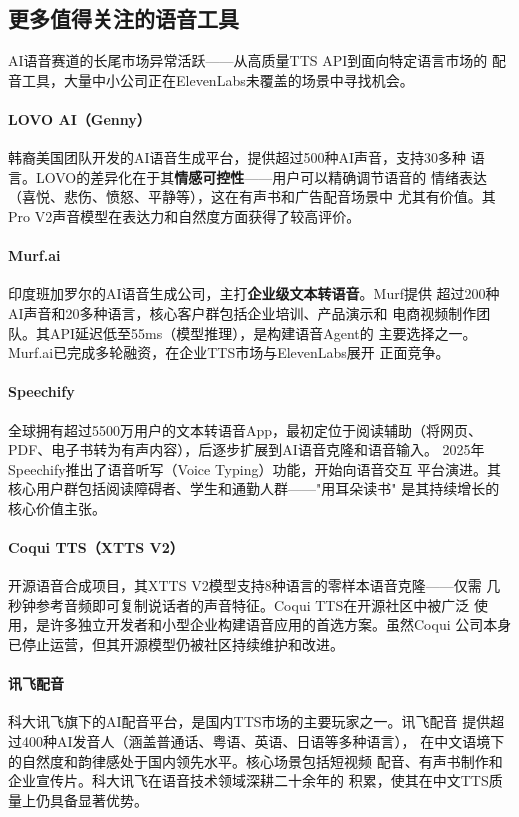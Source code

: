 \subsection{更多值得关注的语音工具}

AI语音赛道的长尾市场异常活跃——从高质量TTS API到面向特定语言市场的
配音工具，大量中小公司正在ElevenLabs未覆盖的场景中寻找机会。

\paragraph{LOVO AI（Genny）}
韩裔美国团队开发的AI语音生成平台，提供超过500种AI声音，支持30多种
语言。LOVO的差异化在于其\textbf{情感可控性}——用户可以精确调节语音的
情绪表达（喜悦、悲伤、愤怒、平静等），这在有声书和广告配音场景中
尤其有价值。其Pro V2声音模型在表达力和自然度方面获得了较高评价。

\paragraph{Murf.ai}
印度班加罗尔的AI语音生成公司，主打\textbf{企业级文本转语音}。Murf提供
超过200种AI声音和20多种语言，核心客户群包括企业培训、产品演示和
电商视频制作团队。其API延迟低至55ms（模型推理），是构建语音Agent的
主要选择之一。Murf.ai已完成多轮融资，在企业TTS市场与ElevenLabs展开
正面竞争。

\paragraph{Speechify}
全球拥有超过5500万用户的文本转语音App，最初定位于阅读辅助（将网页、
PDF、电子书转为有声内容），后逐步扩展到AI语音克隆和语音输入。
2025年Speechify推出了语音听写（Voice Typing）功能，开始向语音交互
平台演进。其核心用户群包括阅读障碍者、学生和通勤人群——"用耳朵读书"
是其持续增长的核心价值主张。

\paragraph{Coqui TTS（XTTS V2）}
开源语音合成项目，其XTTS V2模型支持8种语言的零样本语音克隆——仅需
几秒钟参考音频即可复制说话者的声音特征。Coqui TTS在开源社区中被广泛
使用，是许多独立开发者和小型企业构建语音应用的首选方案。虽然Coqui
公司本身已停止运营，但其开源模型仍被社区持续维护和改进。

\paragraph{讯飞配音}
科大讯飞旗下的AI配音平台，是国内TTS市场的主要玩家之一。讯飞配音
提供超过400种AI发音人（涵盖普通话、粤语、英语、日语等多种语言），
在中文语境下的自然度和韵律感处于国内领先水平。核心场景包括短视频
配音、有声书制作和企业宣传片。科大讯飞在语音技术领域深耕二十余年的
积累，使其在中文TTS质量上仍具备显著优势。

